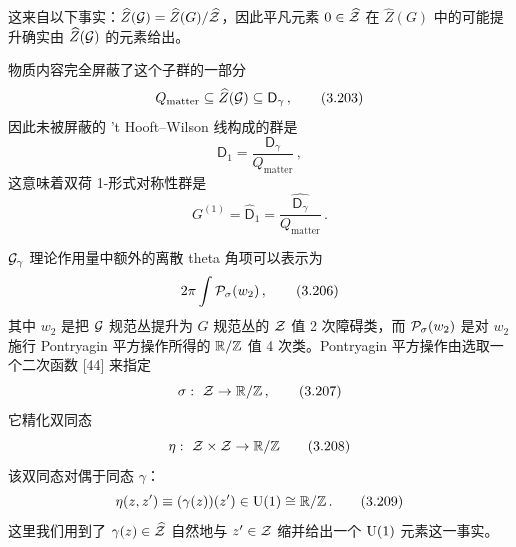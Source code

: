 

这来自以下事实：$\widehat{Z}(\mathcal{G}) = \widehat{Z}(G)/\widehat{\mathcal{Z}}$，因此平凡元素 $0 \in \widehat{\mathcal{Z}}$ 在 $\widehat{Z}(G)$ 中的可能提升确实由 $\widehat{Z}(\mathcal{G})$ 的元素给出。

物质内容完全屏蔽了这个子群的一部分
\begin{equation}
    Q_{\mathrm{matter}} \subseteq \widehat{Z}(\mathcal{G}) \subseteq \mathsf{D}_\gamma \,,
    \tag{3.203}
\end{equation}
因此未被屏蔽的 't Hooft--Wilson 线构成的群是
\begin{equation}
    \mathsf{D}_1 = \frac{\mathsf{D}_\gamma}{Q_{\mathrm{matter}}} \,,
    \tag{3.204}
\end{equation}
这意味着双荷 1-形式对称性群是
\begin{equation}
    G^{(1)} = \widehat{\mathsf{D}}_1 = \widehat{\dfrac{\mathsf{D}_\gamma}{Q_{\mathrm{matter}}}} \,.
    \tag{3.205}
\end{equation}

$\mathcal{G}_\gamma$ 理论作用量中额外的离散 theta 角项可以表示为
\begin{equation}
    2\pi \int \mathcal{P}_\sigma(w_2) \,,
    \tag{3.206}
\end{equation}
其中 $w_2$ 是把 $\mathcal{G}$ 规范丛提升为 $G$ 规范丛的 $\mathcal{Z}$ 值 2 次障碍类，而 $\mathcal{P}_\sigma(w_2)$ 是对 $w_2$ 施行 Pontryagin 平方操作所得的 $\mathbb{R}/\mathbb{Z}$ 值 4 次类。Pontryagin 平方操作由选取一个二次函数 [44] 来指定
\begin{equation}
    \sigma:\ \mathcal{Z} \to \mathbb{R}/\mathbb{Z} \,,
    \tag{3.207}
\end{equation}
它精化双同态
\begin{equation}
    \eta:\ \mathcal{Z} \times \mathcal{Z} \to \mathbb{R}/\mathbb{Z}
    \tag{3.208}
\end{equation}
该双同态对偶于同态 $\gamma$：
\begin{equation}
    \eta(z, z') \equiv (\gamma(z))(z') \in \mathrm{U}(1) \cong \mathbb{R}/\mathbb{Z} \,.
    \tag{3.209}
\end{equation}
这里我们用到了 $\gamma(z) \in \widehat{\mathcal{Z}}$ 自然地与 $z' \in \mathcal{Z}$ 缩并给出一个 $\mathrm{U}(1)$ 元素这一事实。


